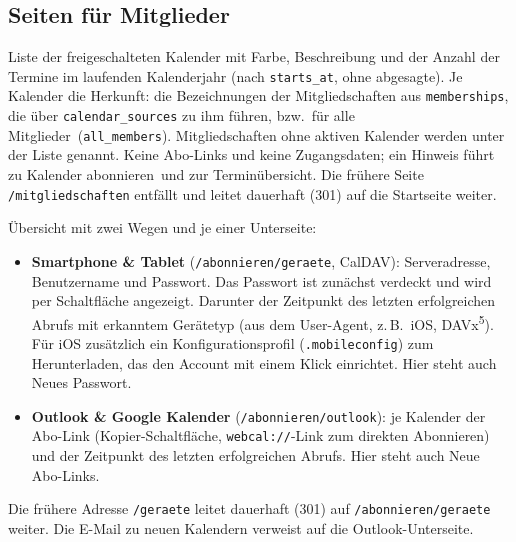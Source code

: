 \documentclass[a4paper,fontsize=10pt]{scrartcl}
\newcommand{\code}[1]{\texttt{#1}}
\begin{document}
\subsection{Seiten für Mitglieder}

\begin{description}[style=nextline, leftmargin=1.2cm]
  \item[Startseite \glqq Meine Kalender\grqq\ (\code{/})]
    Liste der freigeschalteten Kalender mit Farbe, Beschreibung und der
    Anzahl der Termine im laufenden Kalenderjahr (nach \code{starts\_at},
    ohne abgesagte). Je Kalender die Herkunft: die Bezeichnungen der
    Mitgliedschaften aus \code{memberships}, die über
    \code{calendar\_sources} zu ihm führen, bzw.\ \glqq für alle
    Mitglieder\grqq\ (\code{all\_members}). Mitgliedschaften ohne aktiven
    Kalender werden unter der Liste genannt. Keine Abo-Links und keine
    Zugangsdaten; ein Hinweis führt zu \glqq Kalender abonnieren\grqq\ und
    zur Terminübersicht. Die frühere Seite \code{/mitgliedschaften} entfällt
    und leitet dauerhaft (301) auf die Startseite weiter.
  \item[Kalender abonnieren (\code{/abonnieren})]
    Übersicht mit zwei Wegen und je einer Unterseite:
    \begin{itemize}
      \item \textbf{Smartphone \& Tablet} (\code{/abonnieren/geraete},
            CalDAV): Serveradresse, Benutzername und Passwort. Das Passwort
            ist zunächst verdeckt und wird per Schaltfläche angezeigt.
            Darunter der Zeitpunkt des letzten erfolgreichen Abrufs mit
            erkanntem Gerätetyp (aus dem User-Agent, z.\,B.\ \glqq iOS\grqq,
            \glqq DAVx\textsuperscript{5}\grqq). Für iOS zusätzlich ein
            Konfigurationsprofil (\code{.mobileconfig}) zum Herunterladen,
            das den Account mit einem Klick einrichtet. Hier steht auch
            \glqq Neues Passwort\grqq.
      \item \textbf{Outlook \& Google Kalender} (\code{/abonnieren/outlook}):
            je Kalender der Abo-Link (Kopier-Schaltfläche,
            \code{webcal://}-Link zum direkten Abonnieren) und der Zeitpunkt
            des letzten erfolgreichen Abrufs. Hier steht auch \glqq Neue
            Abo-Links\grqq.
    \end{itemize}
    Die frühere Adresse \code{/geraete} leitet dauerhaft (301) auf
    \code{/abonnieren/geraete} weiter. Die E-Mail zu neuen Kalendern
    verweist auf die Outlook-Unterseite.
  \item[Terminübersicht]

\end{description}
\end{document}
